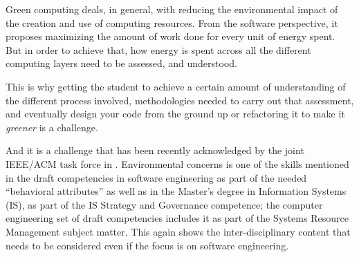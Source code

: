 \documentclass[sigconf]{acmart}
\begin{document}
Green computing \cite{kurp2008green} deals, in general, with reducing the
environmental impact of the creation and use of computing resources. From the
software perspective, it proposes maximizing the amount of work done for every
unit of energy spent. But in order to achieve that, how energy is spent across
all the different computing layers need to be assessed, and understood.

This is why getting the student to achieve a certain amount of understanding of
the different process involved, methodologies needed to carry out that
assessment, and eventually design your code from the ground up or refactoring it
to make it {\em greener} is a challenge.

And it is a challenge that has been recently acknowledged by the joint IEEE/ACM
task force in \cite{cc2020}. Environmental concerns is one of the skills
mentioned in the draft competencies in software engineering as part of the
needed ``behavioral attributes'' as well as in the
Master's degree in Information Systems (IS), as part of the IS Strategy and
Governance competence; the computer engineering set of draft competencies
includes it as part of the Systems Resource Management subject matter. This
again shows the inter-disciplinary content that needs to be considered even if
the focus is on software engineering.
\end{document}
